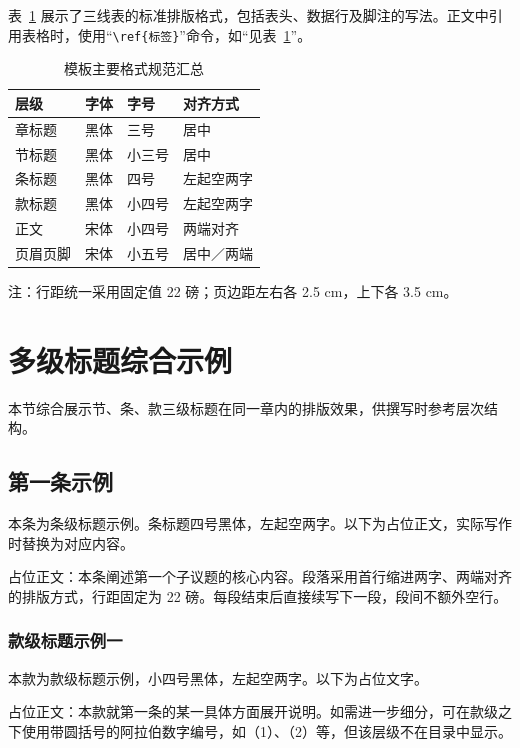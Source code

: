 表~\ref{tab:example} 展示了三线表的标准排版格式，包括表头、数据行及脚注的写法。正文中引用表格时，使用“\texttt{\textbackslash ref\{标签\}}”命令，如“见表~\ref{tab:example}”。

\begin{table}[htbp]
  \centering
  \caption{模板主要格式规范汇总}
  \label{tab:example}
  \begin{tabular}{llll}
    \toprule
    层级 & 字体 & 字号 & 对齐方式 \\
    \midrule
    章标题   & 黑体 & 三号   & 居中 \\
    节标题   & 黑体 & 小三号 & 居中 \\
    条标题   & 黑体 & 四号   & 左起空两字 \\
    款标题   & 黑体 & 小四号 & 左起空两字 \\
    正文     & 宋体 & 小四号 & 两端对齐 \\
    页眉页脚 & 宋体 & 小五号 & 居中／两端 \\
    \bottomrule
  \end{tabular}

  \smallskip
  \raggedright{}\songti 注：行距统一采用固定值 22 磅；页边距左右各 2.5 cm，上下各 3.5 cm。
\end{table}

\section{多级标题综合示例}
本节综合展示节、条、款三级标题在同一章内的排版效果，供撰写时参考层次结构。

\subsection{第一条示例}
本条为条级标题示例。条标题四号黑体，左起空两字。以下为占位正文，实际写作时替换为对应内容。

占位正文：本条阐述第一个子议题的核心内容。段落采用首行缩进两字、两端对齐的排版方式，行距固定为 22 磅。每段结束后直接续写下一段，段间不额外空行。

\subsubsection{款级标题示例一}
本款为款级标题示例，小四号黑体，左起空两字。以下为占位文字。

占位正文：本款就第一条的某一具体方面展开说明。如需进一步细分，可在款级之下使用带圆括号的阿拉伯数字编号，如（1）、（2）等，但该层级不在目录中显示。

